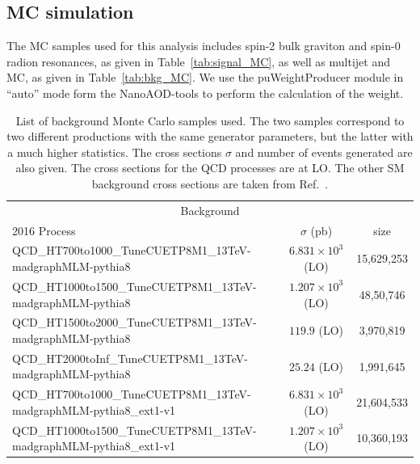 \subsection{MC simulation\label{ss:MCSimulation}}
The MC samples used for this analysis includes spin-2 bulk graviton and spin-0 radion resonances, as given in Table~\ref{tab:signal_MC}, as well as multijet and \ttbar MC, as given in Table~\ref{tab:bkg_MC}. 
We use the puWeightProducer module in ``auto'' mode form the NanoAOD-tools to perform the calculation of the weight.
\begin{table}[htb]\scriptsize
  \begin{center}
    \caption{List of background Monte Carlo samples used. The two \ttjets samples correspond to two different productions with the same generator parameters, but the latter with a much higher statistics. The cross sections $\sigma$ and number of events generated are also given. The cross sections for the QCD processes are at LO. The other SM background cross sections are taken from Ref.~\cite{SMXsecTWiki13TeV}.}    
    \begin{tabular}{l|c|c}
      \hline
      \hline
      \multicolumn{3}{c}{Background} \\ \cline{1-3}
      2016 Process & $\sigma$ (pb) & size \\
      \hline
      {QCD\_HT700to1000\_TuneCUETP8M1\_13TeV-madgraphMLM-pythia8}  & $6.831\times 10^3$  (LO) & 15,629,253 \\
      {QCD\_HT1000to1500\_TuneCUETP8M1\_13TeV-madgraphMLM-pythia8} & $1.207\times 10^3$  (LO) & 48,50,746  \\
      {QCD\_HT1500to2000\_TuneCUETP8M1\_13TeV-madgraphMLM-pythia8} & $119.9 $            (LO) & 3,970,819  \\
      {QCD\_HT2000toInf\_TuneCUETP8M1\_13TeV-madgraphMLM-pythia8}  & $25.24 $            (LO) & 1,991,645  \\
      {QCD\_HT700to1000\_TuneCUETP8M1\_13TeV-madgraphMLM-pythia8\_ext1-v1}  & $6.831\times 10^3$  (LO) & 21,604,533 \\
      {QCD\_HT1000to1500\_TuneCUETP8M1\_13TeV-madgraphMLM-pythia8\_ext1-v1} & $1.207\times 10^3$  (LO) & 10,360,193  \\

\end{tabular}
\end{center}
\end{table}
